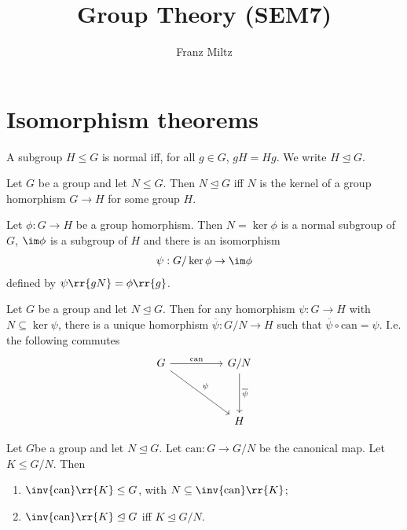 \documentclass{article}
\begin{document}
\mkthmstwounified
\title{Group Theory (SEM7)}
\author{Franz Miltz}
\maketitle
\tableofcontents
\pagebreak

\section{Isomorphism theorems}
\label{sec:isomorphism-theorems}

\begin{definition}
	\label{def:normal-subgroup}
	A subgroup $H\leq G$ is normal iff, for all $g\in G$, $gH=Hg$. We write $H\trianglelefteq G$.
\end{definition}

\begin{theorem}
	Let $G$ be a group and let $N\leq G$. Then $N\trianglelefteq G$ iff $N$ is the kernel
	of a group homorphism $G\to H$ for some group $H$.
\end{theorem}

\begin{theorem}
	\label{thm:first-iso-theorem}
	Let $\phi:G\to H$ be a group homorphism. Then $N=\ker\phi$ is a normal subgroup of
	$G$, $\im\phi$ is a subgroup of $H$ and there is an isomorphism
	\begin{align*}
		\psi : G/\ker\phi \to \im\phi
	\end{align*}
	defined by $\psi\rr{gN}=\phi\rr{g}$.
\end{theorem}

\begin{theorem}
	\label{thm:up-factor-groups}
	Let $G$ be a group and let $N\trianglelefteq G$. Then for any homorphism $\psi:G\to H$
	with $N\subseteq\ker\psi$, there is a unique homorphism $\overline\psi:G/N\to H$ such
	that $\overline\psi\circ\text{can}=\psi$. I.e. the following commutes
	\begin{equation}
		\begin{tikzcd}[row sep=huge, column sep=huge]
			G \arrow{r}{\text{can}} \arrow{dr}{\psi} & G/N \arrow{d}{\overline\psi} \\
			& H
		\end{tikzcd}
	\end{equation}
\end{theorem}

\begin{proposition}
	Let $G$be a group and let $N\trianglelefteq G$. Let $\text{can}:G\to G/N$ be the canonical
	map. Let $K\leq G/N$. Then
	\begin{enumerate}
		\item $\inv{\text{can}}\rr{K}\leq G$, with $N\subseteq\inv{\text{can}}\rr{K}$;
		\item $\inv{\text{can}}\rr{K}\trianglelefteq G$ iff $K\trianglelefteq G/N$.
	\end{enumerate}
\end{proposition}
\end{document}
